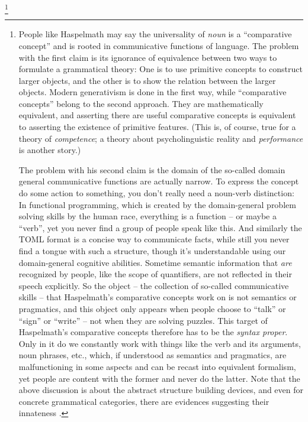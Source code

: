 \documentclass[UTF8, a4paper, oneside, scheme=plain]{ctexrep}
\newcommand*{\term}[1]{\emph{#1}}
\begin{document}
\footnote{
    People like Haspelmath may say the universality of \term{noun} 
    is a ``comparative concept'' and is rooted in communicative functions of language.
    The problem with the first claim is its ignorance of equivalence between 
    two ways to formulate a grammatical theory:
    One is to use primitive concepts to construct larger objects,
    and the other is to show the relation between the larger objects.
    Modern generativism is done in the first way,
    while ``comparative concepts'' belong to the second approach.
    They are mathematically equivalent,
    and asserting there are useful comparative concepts 
    is equivalent to asserting the existence of primitive features.
    (This is, of course, true for a theory of \emph{competence};
    a theory about psycholinguistic reality and \emph{performance} is another story.)

    The problem with his second claim is the domain of 
    the so-called domain general communicative functions 
    are actually narrow.
    To express the concept do some action to something,
    you don't really need a noun-verb distinction:
    In functional programming, which is created by the domain-general problem solving skills by the human race,
    everything is a function -- or maybe a ``verb'',
    yet you never find a group of people speak like this.
    And similarly the TOML format is a concise way to communicate facts,
    while still you never find a tongue with such a structure,
    though it's understandable using our domain-general cognitive abilities.
    Sometime semantic information that \emph{are} recognized by people,
    like the scope of quantifiers, 
    are not reflected in their speech explicitly.
    So the object -- the collection of so-called communicative skills -- 
    that Haspelmath's comparative concepts work on 
    is not semantics or pragmatics,
    and this object only appears when people choose to ``talk'' or ``sign'' or ``write''
    -- not when they are solving puzzles.
    This target of Haspelmath's comparative concepts therefore has to be the \emph{syntax proper}.
    Only in it do we constantly work with things like the verb and its arguments,
    noun phrases, etc., 
    which, if understood as semantics and pragmatics,
    are malfunctioning in some aspects
    and can be recast into equivalent formalism,
    yet people are content with the former 
    and never do the latter.
    Note that the above discussion is about the abstract structure building devices,
    and even for concrete grammatical categories,
    there are evidences suggesting their innateness \citep{satik2022cartography}.
}
\end{document}
